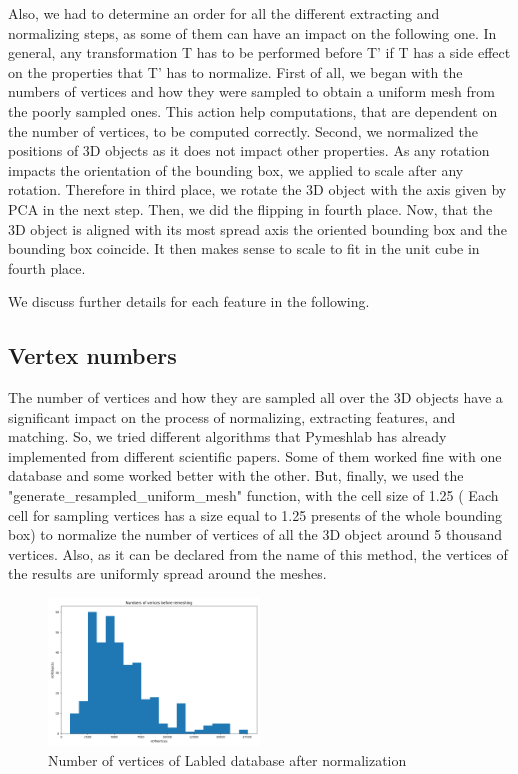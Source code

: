 \documentclass[10pt,twocolumn,letterpaper]{article}
\begin{document}
Also, we had to determine an order for all the different extracting and normalizing steps, as some of them can have an impact on the following one. In general, any transformation T has to be performed before T' if T has a side effect on the properties that T'  has to normalize. First of all, we began with the numbers of vertices and how they were sampled to obtain a uniform mesh from the poorly sampled ones. This action help computations, that are dependent on the number of vertices, to be computed correctly. Second, we normalized the positions of 3D objects as it does not impact other properties. As any rotation impacts the orientation of the bounding box, we applied to scale after any rotation. Therefore in third place, we rotate the 3D object with the axis given by PCA in the next step. Then, we did the flipping in fourth place. Now, that the 3D object is aligned with its most spread axis the oriented bounding box and the bounding box coincide. It then makes sense to scale to fit in the unit cube in fourth place.

We discuss further details for each feature in the following.


\subsection{Vertex numbers}
The number of vertices and how they are sampled all over the 3D objects have a significant impact on the process of normalizing, extracting features, and matching. So, we tried different algorithms that Pymeshlab has already implemented from different scientific papers. Some of them worked fine with one database and some worked better with the other. But, finally, we used the "generate_resampled_uniform_mesh" function, with the cell size of 1.25 ( Each cell for sampling vertices has a size equal to 1.25 presents of the whole bounding box) to normalize the number of vertices of all the 3D object around 5 thousand vertices. Also, as it can be declared from the name of this method, the vertices of the results are uniformly spread around the meshes.
\label{subsec:vertex numbers}
\begin{figure}[h!]
\begin{center}
  \includegraphics[width=0.5\textwidth]{picture/Labled_afterRemesh}
  \caption{Number of vertices of Labled database after normalization}
  \label{fig:labledDb-vertices}
  \end{center}
\end{figure}
\end{document}
